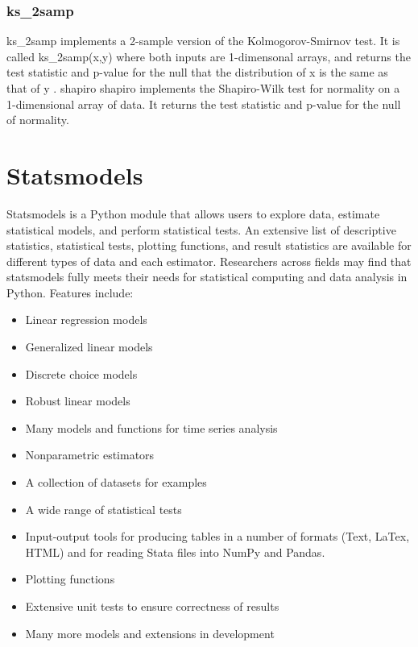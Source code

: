 \documentclass[KSmain.tex]{subfiles}
\begin{document}
\subsubsection{ks\_2samp}
ks\_2samp implements a 2-sample version of the Kolmogorov-Smirnov test. It is called ks\_2samp(x,y)
where both inputs are 1-dimensonal arrays, and returns the test statistic and p-value for the null that
the distribution of x is the same as that of y .
shapiro
shapiro implements the Shapiro-Wilk test for normality on a 1-dimensional array of data. It returns the
test statistic and p-value for the null of normality.

\newpage
\section{Statsmodels}
Statsmodels is a Python module that allows users to explore data, estimate statistical models, and perform statistical tests. 
An extensive list of descriptive statistics, statistical tests, plotting functions, and result statistics are available for different types of 
data and each estimator. Researchers across fields may find that statsmodels fully meets their needs for statistical computing and data analysis 
in Python. Features include:


\begin{itemize}

\item Linear regression models

\item Generalized linear models

\item Discrete choice models

\item Robust linear models

\item Many models and functions for time series analysis

\item Nonparametric estimators

\item A collection of datasets for examples

\item A wide range of statistical tests

\item Input-output tools for producing tables in a number of formats (Text, LaTex, HTML) and for reading Stata files into NumPy and Pandas.

\item Plotting functions

\item Extensive unit tests to ensure correctness of results

\item Many more models and extensions in development

\end{itemize}
\end{document}
